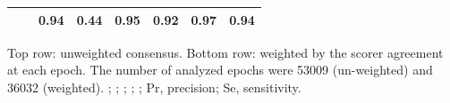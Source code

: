 \begin{table}
\begin{threeparttable}
\begin{tabular}{@{}llSSSSSS@{}}
        &        & 0.94    & 0.44   & 0.95    & 0.92   & 0.97    & 0.94                 \\ \bottomrule
    \end{tabular}
    \begin{tablenotes}
    \small \item Top row: unweighted consensus. Bottom row: weighted by the scorer agreement at each epoch. The number of analyzed epochs were \num{53009} (un-weighted) and \num{36032} (weighted). %
    ; %
    ; %
    ; %
    ; %
    ; %
    Pr, precision; Se, sensitivity.
    \end{tablenotes}
\end{threeparttable}
\end{table}
